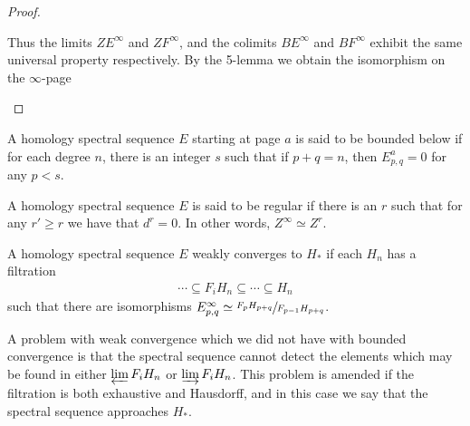 \documentclass[../thesis.tex]{subfiles}
\begin{document}
\begin{proof}
\begin{center}
            \end{center}
            Thus the limits $ZE^\infty$ and $ZF^\infty$, and the colimits $BE^\infty$ and $BF^\infty$ exhibit the same universal property respectively. By the 5-lemma we obtain the isomorphism on the $\infty$-page
            \begin{center}
            \end{center}
        \end{proof}

        \begin{definition}
            A homology spectral sequence $E$ starting at page $a$ is said to be bounded below if for each degree $n$, there is an integer $s$ such that if $p+q = n$, then $E^a_{p,q} = 0$ for any $p < s$. 
        \end{definition}

        \begin{definition}
            A homology spectral sequence $E$ is said to be regular if there is an $r$ such that for any $r' \geq r$ we have that $d^r = 0$. In other words, $Z^\infty \simeq Z^r$.
        \end{definition}

        \begin{definition}
            A homology spectral sequence $E$ weakly converges to $H_*$ if each $H_n$ has a filtration
            \begin{align*}
                \cdots \subseteq F_iH_n \subseteq \cdots \subseteq H_n
            \end{align*}
            such that there are isomorphisms $E^\infty_{p,q} \simeq \sfrac{F_pH_{p+q}}{F_{p-1}H_{p+q}}$.
        \end{definition}

        A problem with weak convergence which we did not have with bounded convergence is that the spectral sequence cannot detect the elements which may be found in either $\varprojlim F_iH_n$ or $\varinjlim F_iH_n$. This problem is amended if the filtration is both exhaustive and Hausdorff, and in this case we say that the spectral sequence approaches $H_*$.
\end{document}

